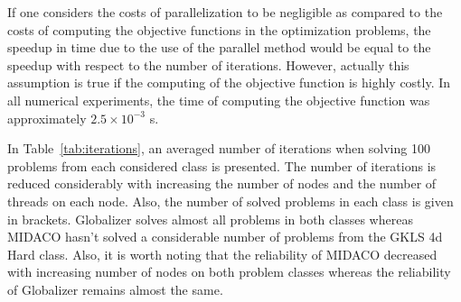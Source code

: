 \documentclass{svproc}
\begin{document}
If one considers the costs of parallelization to be negligible as compared to the costs of computing the
objective functions in the optimization problems, the speedup in time due to the use of the parallel
method would be equal to the speedup with respect to the number of iterations. However, actually
this assumption is true if the computing of the objective function is highly costly. In
all numerical experiments, the time of computing the objective function was approximately $2.5\times
10^{-3}$ s.

In Table~\ref{tab:iterations}, an averaged number of iterations when solving 100 problems from
each considered class is presented.
The number of iterations is reduced considerably with increasing the number of nodes and the
number of threads on each node. Also, the number of solved problems in each class is given  in
brackets.
Globalizer solves almost all problems in both classes whereas MIDACO hasn't solved a considerable
number of problems from the GKLS 4d Hard class. Also, it is worth noting that the reliability of
MIDACO decreased with increasing number of nodes on both problem classes whereas the
reliability of Globalizer remains almost the same.
\end{document}
